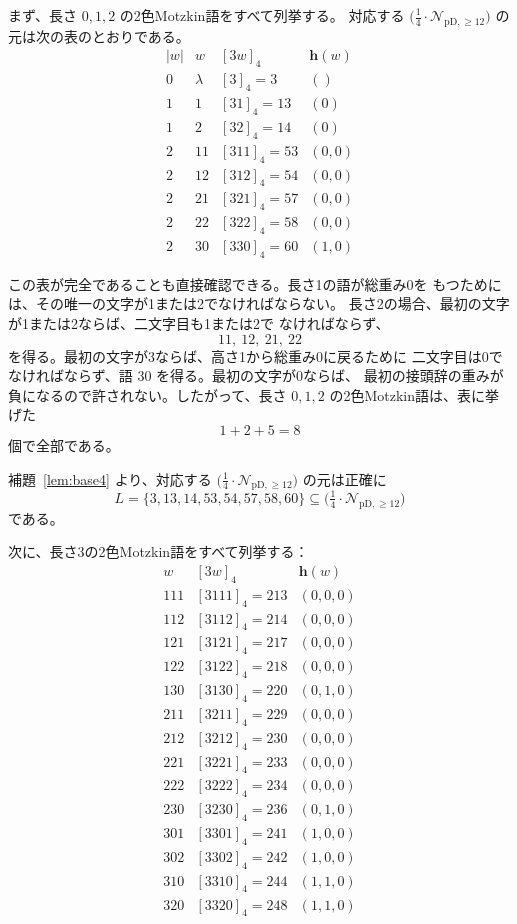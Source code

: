 \documentclass[12pt]{ltjsarticle}
\theoremstyle{plain}
\theoremstyle{definition}
\theoremstyle{plain}
\newcommand{\Pset}{%
  \bigl(\tfrac{1}{4}\cdot\mathcal{N}_{\mathrm{pD},\geq 12}\bigr)%
}
\begin{document}
まず、長さ $0,1,2$ の2色Motzkin語をすべて列挙する。
対応する $\Pset$ の元は次の表のとおりである。
\[
\begin{array}{c|c|c|c}
 |w|&w&[3w]_4&\mathbf h(w)\\ \hline
0&\lambda &[3]_4=3&()\\ \hline
1&1 &[31]_4=13&(0)\\
1&2 &[32]_4=14&(0)\\ \hline
2&11 &[311]_4=53&(0,0)\\
2&12 &[312]_4=54&(0,0)\\
2&21 &[321]_4=57&(0,0)\\
2&22 &[322]_4=58&(0,0)\\
2&30 &[330]_4=60&(1,0)
\end{array}
\]

この表が完全であることも直接確認できる。長さ1の語が総重み0を
もつためには、その唯一の文字が1または2でなければならない。
長さ2の場合、最初の文字が1または2ならば、二文字目も1または2で
なければならず、
\[
 11,\ 12,\ 21,\ 22
\]
を得る。最初の文字が3ならば、高さ1から総重み0に戻るために
二文字目は0でなければならず、語 $30$ を得る。最初の文字が0ならば、
最初の接頭辞の重みが負になるので許されない。したがって、長さ
$0,1,2$ の2色Motzkin語は、表に挙げた
\[
 1+2+5=8
\]
個で全部である。

補題~\ref{lem:base4} より、対応する $\Pset$ の元は正確に
\begin{equation}\label{eq:L-def}
 L=\{3,13,14,53,54,57,58,60\}
 \subseteq\Pset
\end{equation}
である。

次に、長さ3の2色Motzkin語をすべて列挙する：
\[
\begin{array}{c|c|c}
 w&[3w]_4&\mathbf h(w)\\ \hline
111 &[3111]_4=213&(0,0,0)\\
112 &[3112]_4=214&(0,0,0)\\
121 &[3121]_4=217&(0,0,0)\\
122 &[3122]_4=218&(0,0,0)\\
130 &[3130]_4=220&(0,1,0)\\ \hline
211 &[3211]_4=229&(0,0,0)\\
212 &[3212]_4=230&(0,0,0)\\
221 &[3221]_4=233&(0,0,0)\\
222 &[3222]_4=234&(0,0,0)\\
230 &[3230]_4=236&(0,1,0)\\ \hline
301 &[3301]_4=241&(1,0,0)\\
302 &[3302]_4=242&(1,0,0)\\
310 &[3310]_4=244&(1,1,0)\\
320 &[3320]_4=248&(1,1,0)
\end{array}
\]
\end{document}
